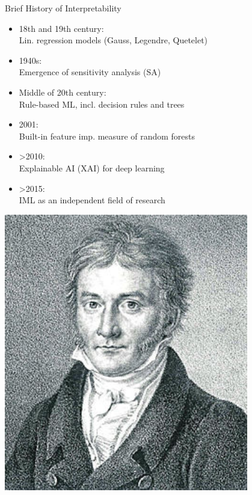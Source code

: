 \documentclass[10pt,compress,t,notes=noshow, xcolor=table]{beamer}
\begin{document}
\begin{frame}{Brief History of Interpretability}

\begin{splitVCC}[0.75]
{
\begin{itemize}
        \item 18th and 19th century: \\Lin. regression models (Gauss, Legendre, Quetelet)
        \item 1940s:\\ Emergence of sensitivity analysis (SA)
        \medskip
        \item Middle of 20th century:\\ Rule-based ML, incl. decision rules and  trees
        \medskip
        \item 2001:\\ Built-in feature imp. measure of random forests
        \medskip
        \item >2010: \\Explainable AI (XAI) for deep learning
        \medskip
        \item >2015: \\IML as an independent field of research
    \end{itemize}
}
{
    \includegraphics[width=0.8\textwidth]{figure/Carl_Friedrich_Gauss_1828.jpg}
    
}
\end{splitVCC}
\end{frame}
\end{document}

